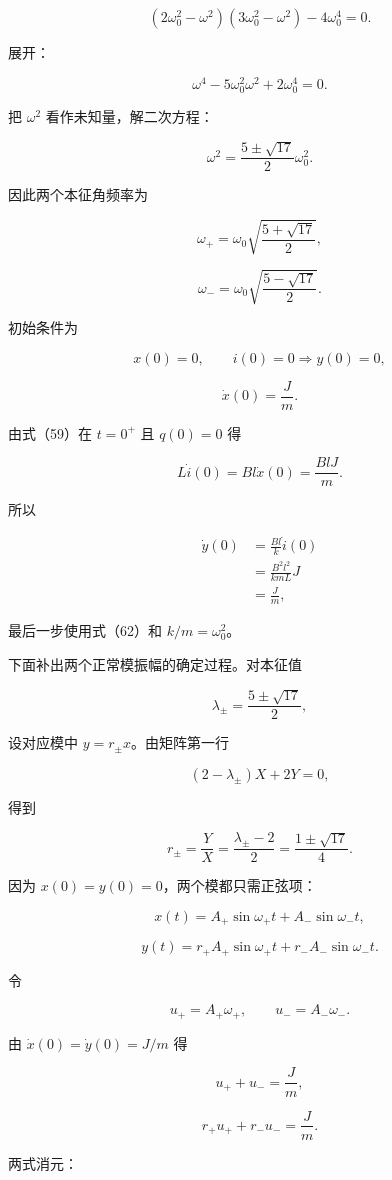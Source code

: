 \documentclass[12pt,a4paper,UTF8]{ctexart}
\begin{document}
\[\left(2\omega_0^2-\omega^2\right)
\left(3\omega_0^2-\omega^2\right)-4\omega_0^4=0.\]

展开：

\[\omega^4-5\omega_0^2\omega^2+2\omega_0^4=0. \tag{65}\]

把 \(\omega^2\) 看作未知量，解二次方程：

\[\omega^2=\frac{5\pm\sqrt{17}}{2}\omega_0^2.\]

因此两个本征角频率为

\[\omega_+=\omega_0\sqrt{\frac{5+\sqrt{17}}2},\]

\[\omega_-=\omega_0\sqrt{\frac{5-\sqrt{17}}2}. \tag{66}\]

初始条件为

\[x(0)=0,\qquad i(0)=0\Rightarrow y(0)=0,\]

\[\dot x(0)=\frac Jm.\]

由式（59）在 \(t=0^+\) 且 \(q(0)=0\) 得

\[L\dot i(0)=Bl\dot x(0)=\frac{BlJ}{m}.\]

所以

\[\begin{aligned}
\dot y(0)
&=\frac{Bl}{k}\dot i(0)\\
&=\frac{B^2l^2}{kmL}J\\
&=\frac Jm,
\end{aligned} \tag{67}\]

最后一步使用式（62）和 \(k/m=\omega_0^2\)。

下面补出两个正常模振幅的确定过程。对本征值

\[\lambda_\pm=\frac{5\pm\sqrt{17}}2,\]

设对应模中 \(y=r_\pm x\)。由矩阵第一行

\[(2-\lambda_\pm)X+2Y=0,\]

得到

\[r_\pm=\frac{Y}{X}
=\frac{\lambda_\pm-2}{2}
=\frac{1\pm\sqrt{17}}4. \tag{67a}\]

因为 \(x(0)=y(0)=0\)，两个模都只需正弦项：

\[x(t)=A_+\sin\omega_+t+A_-\sin\omega_-t,\]

\[y(t)=r_+A_+\sin\omega_+t+r_-A_-\sin\omega_-t. \tag{67b}\]

令

\[u_+=A_+\omega_+,\qquad u_-=A_-\omega_-.\]

由 \(\dot x(0)=\dot y(0)=J/m\) 得

\[u_++u_-=\frac Jm,\]

\[r_+u_++r_-u_-=\frac Jm.\]

两式消元：
\end{document}
